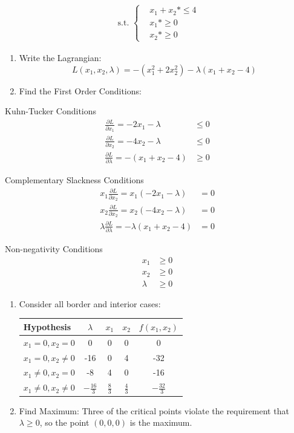 \documentclass[]{book}
\providecommand{\tightlist}{%
  \setlength{\itemsep}{0pt}\setlength{\parskip}{0pt}}
\theoremstyle{definition}
\theoremstyle{definition}
\theoremstyle{definition}
\theoremstyle{remark}
\begin{document}
\begin{align*}
\text{ s.t. } 
\begin{cases}
&x_1 + x_2 *\le 4\\
&x_1 *\ge 0\\
&x_2 *\ge 0
\end{cases}
\end{align*}

\begin{enumerate}
\def\labelenumi{\arabic{enumi}.}
\item
  Write the Lagrangian:
  \[L(x_1, x_2, \lambda) =  -(x_1^2 + 2x_2^2) - \lambda(x_1 + x_2 - 4)\]
\item
  Find the First Order Conditions:
\end{enumerate}

Kuhn-Tucker Conditions
\begin{align*}
\frac{\partial L}{\partial x_1} = -2x_1 - \lambda  &\leq 0\\
\frac{\partial L}{\partial x_2}  = -4x_2 - \lambda & \leq  0\\
\frac{\partial L}{\partial \lambda} = -(x_1 + x_2 - 4)& \geq 0
\end{align*}

Complementary Slackness Conditions
\begin{align*}
x_1\frac{\partial L}{\partial x_2} = x_1(-2x_1 - \lambda)  &= 0\\
x_2\frac{\partial L}{\partial x_2} = x_2(-4x_2 - \lambda)  &= 0\\
\lambda\frac{\partial L}{\partial \lambda} = -\lambda(x_1 + x_2 - 4)&= 0
\end{align*}

Non-negativity Conditions
\begin{align*}
x_1 & \geq  0\\
x_2 & \geq 0\\
\lambda & \geq 0
\end{align*}

\begin{enumerate}
\def\labelenumi{\arabic{enumi}.}
\setcounter{enumi}{2}
\tightlist
\item
  Consider all border and interior cases:

  \begin{center}
  \begin{tabular}{|l|ccc|c|}
  \hline
  Hypothesis  & $\lambda$& $x_1$ & $x_2$ & $f(x_1, x_2)$\\
  \hline
  $x_1 = 0, x_2 = 0$  &0 & 0 & 0 & 0\\
  $x_1 = 0, x_2 \neq 0$  &-16 & 0 & 4 & -32\\
  $x_1 \neq 0, x_2 = 0$  &-8 & 4 & 0 & -16\\
  $x_1 \neq 0, x_2 \neq 0$ & $-\frac{16}{3}$ & $\frac{8}{3}$ & $\frac{4}{3}$ & $-\frac{32}{3}$\\
  \hline
  \end{tabular}
  \end{center}
\item
  Find Maximum:
  Three of the critical points violate the requirement that \(\lambda \geq 0\), so the point \((0,0,0)\) is the maximum.
\end{enumerate}
\end{document}
